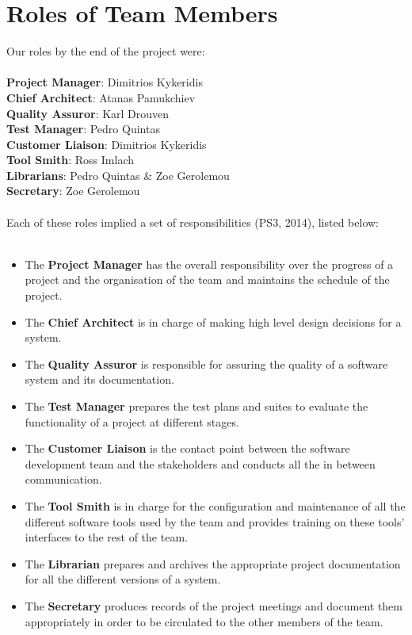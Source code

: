 \documentclass{l3proj}
\begin{document}
\section{Roles of Team Members}
\par
Our roles by the end of the project were:\\
\\
\textbf{Project Manager}: Dimitrios Kykeridis\\
\textbf{Chief Architect}: Atanas Pamukchiev\\
\textbf{Quality Assuror}: Karl Drouven\\
\textbf{Test Manager}: Pedro Quintas\\
\textbf{Customer Liaison}: Dimitrios Kykeridis\\
\textbf{Tool Smith}: Ross Imlach\\
\textbf{Librarians}: Pedro Quintas \& Zoe Gerolemou\\
\textbf{Secretary}: Zoe Gerolemou\\
\\
Each of these roles implied a set of responsibilities (PS3, 2014), listed below:\\
\\
\begin{itemize}

\item The \textbf{Project Manager} has the overall responsibility over the progress of a project and the organisation of the team and maintains the schedule of the project.
\item The \textbf{Chief Architect} is in charge of making high level design decisions for a system.
\item The \textbf{Quality Assuror} is responsible for assuring the quality of a software system and its documentation.
\item The \textbf{Test Manager} prepares the test plans and suites to evaluate the functionality of a project at different stages.
\item The \textbf{Customer Liaison} is the contact point between the software development team and the stakeholders and conducts all the in between communication.
\item The \textbf{Tool Smith} is in charge for the configuration and maintenance of all the different software tools used by the team and provides training on these tools’ interfaces to the rest of the team.
\item The \textbf{Librarian} prepares and archives the appropriate project documentation for all the different versions of a system.
\item The \textbf{Secretary} produces records of the project meetings and document them appropriately in order to be circulated to the other members of the team.

\end{itemize}
\end{document}
